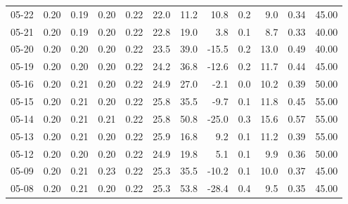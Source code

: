 \begin{threeparttable}
{\begin{tabular}{lrrrrrrrrrrr}
  05-22 &          0.20 &          0.19 &          0.20 &        0.22 &                22.0 &                11.2 &       10.8 &                 0.2 &              9.0 &            0.34 &                  45.00 \\
  05-21 &          0.20 &          0.19 &          0.20 &        0.22 &                22.8 &                19.0 &        3.8 &                 0.1 &              8.7 &            0.33 &                  40.00 \\
  05-20 &          0.20 &          0.20 &          0.20 &        0.22 &                23.5 &                39.0 &      -15.5 &                 0.2 &             13.0 &            0.49 &                  40.00 \\
  05-19 &          0.20 &          0.20 &          0.20 &        0.22 &                24.2 &                36.8 &      -12.6 &                 0.2 &             11.7 &            0.44 &                  45.00 \\
  05-16 &          0.20 &          0.21 &          0.20 &        0.22 &                24.9 &                27.0 &       -2.1 &                 0.0 &             10.2 &            0.39 &                  50.00 \\
  05-15 &          0.20 &          0.21 &          0.20 &        0.22 &                25.8 &                35.5 &       -9.7 &                 0.1 &             11.8 &            0.45 &                  55.00 \\
  05-14 &          0.20 &          0.21 &          0.21 &        0.22 &                25.8 &                50.8 &      -25.0 &                 0.3 &             15.6 &            0.57 &                  55.00 \\
  05-13 &          0.20 &          0.21 &          0.20 &        0.22 &                25.9 &                16.8 &        9.2 &                 0.1 &             11.2 &            0.39 &                  55.00 \\
  05-12 &          0.20 &          0.20 &          0.20 &        0.22 &                24.9 &                19.8 &        5.1 &                 0.1 &              9.9 &            0.36 &                  50.00 \\
  05-09 &          0.20 &          0.21 &          0.23 &        0.22 &                25.3 &                35.5 &      -10.2 &                 0.1 &             10.0 &            0.37 &                  45.00 \\
  05-08 &          0.20 &          0.21 &          0.20 &        0.22 &                25.3 &                53.8 &      -28.4 &                 0.4 &              9.5 &            0.35 &                  45.00 \\

\end{tabular}}
\end{threeparttable}
